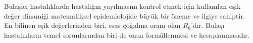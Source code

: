 	Bula{\c{s}}{\i}c{\i} hastal{\i}klarda hastal{\i}{\u{g}}{\i}n yay{\i}lmas{\i}n{\i} kontrol etmek i{\c{c}}in kullan{\i}lan e{\c{s}}ik de{\u{g}}er dinami{\u{g}}i matematiksel epidemiolojide b\"uy\"uk bir \"oneme ve ilgiye sahiptir. En bilinen e{\c{s}}ik de{\u{g}}erlerinden biri, esas {\c{c}}o{\u{g}}alma oran{\i} olan $R_0$'d{\i}r. Bula{\c{s}}{\i} hastal{\i}klar{\i}n temel sorunlar{\i}ndan biri de onun form\"ullenmesi ve hesaplanmas{\i}d{\i}r.
	
